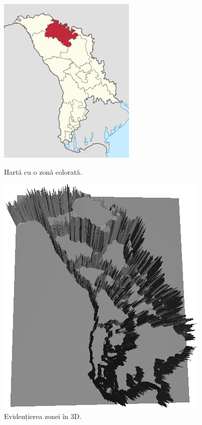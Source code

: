 \documentclass[12pt]{article}
\begin{document}
\begin{figure}[!htb]
\begin{minipage}{0.24\textwidth}
		\centering
		\includegraphics[width=.95\linewidth]{Harta/HartaImg.png}
		\caption{Hartă cu o zonă colorată.}\label{fig:fig6}
	\end{minipage}\hfill
	\begin{minipage}{0.24\textwidth}
		\centering
		\includegraphics[width=.95\linewidth]{Harta/HartaMesh.png}
		\caption{Evidențierea zonei în 3D.}\label{fig:fig7}
	\end{minipage}\hfill
\end{figure}
\end{document}

